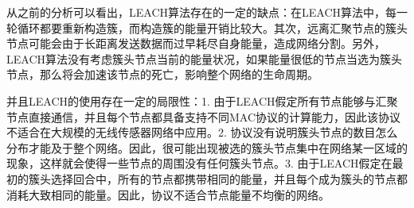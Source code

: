 \documentclass[UTF8]{article} %
\begin{document}
	从之前的分析可以看出，LEACH算法存在的一定的缺点：在LEACH算法中，每一轮循环都要重新构造簇，而构造簇的能量开销比较大。其次，远离汇聚节点的簇头节点可能会由于长距离发送数据而过早耗尽自身能量，造成网络分割。另外，LEACH算法没有考虑簇头节点当前的能量状况，如果能量很低的节点当选为簇头节点，那么将会加速该节点的死亡，影响整个网络的生命周期。
	
	并且LEACH的使用存在一定的局限性：1. 由于LEACH假定所有节点能够与汇聚节点直接通信，并且每个节点都具备支持不同MAC协议的计算能力，因此该协议不适合在大规模的无线传感器网络中应用。2. 协议没有说明簇头节点的数目怎么分布才能及于整个网络。因此，很可能出现被选的簇头节点集中在网络某一区域的现象，这样就会使得一些节点的周围没有任何簇头节点。3. 由于LEACH假定在最初的簇头选择回合中，所有的节点都携带相同的能量，并且每个成为簇头的节点都消耗大致相同的能量。因此，协议不适合节点能量不均衡的网络。
	
\end{document}
